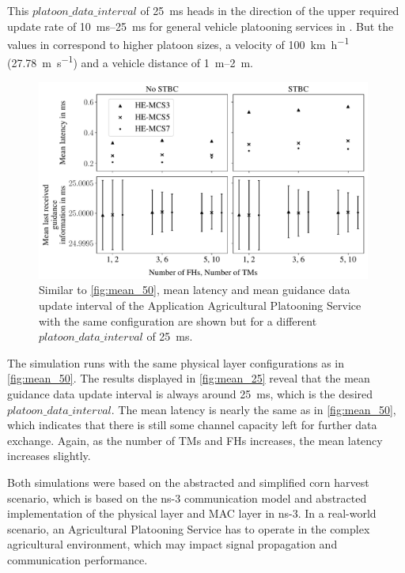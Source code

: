 This $platoon\_data\_interval$ of \SI{25}{\milli\second} heads in the direction of the upper required update rate of \SIrange{10}{25}{\milli\second} for general
vehicle platooning services in \cite{TR-22.886}.
But the values in \cite{TR-22.886} correspond to higher platoon sizes, a velocity of \SI{100}{\kilo\meter\per\hour} (\SI{27.78}{\meter\per\second}) and a
vehicle distance of \SIrange{1}{2}{\metre}.


\begin{figure}[]%
   \centering
   \includegraphics[width=0.98\textwidth]{Latex/figures/latency_lastUpdate25ms}
   \caption{Similar to \autoref{fig:mean_50}, mean latency and mean guidance data update interval of the Application Agricultural Platooning Service
   with the same configuration are shown but for a different $platoon\_data\_interval$ of \SI{25}{\milli\second}.}
   \label{fig:mean_25}%
\end{figure}

The simulation runs with the same physical layer configurations as in \autoref{fig:mean_50}.
The results displayed in \autoref{fig:mean_25} reveal that the mean guidance data update interval is always around \SI{25}{\milli\second},
which is the desired $platoon\_data\_interval$.
The mean latency is nearly the same as in \autoref{fig:mean_50}, which indicates that there is still some channel capacity left for
further data exchange.
Again, as the number of \acp{TM} and \acp{FH} increases, the mean latency increases slightly.

Both simulations were based on the abstracted and simplified corn harvest scenario, which is based on the ns-3 communication model and
abstracted implementation of the physical layer and MAC layer in ns-3.
In a real-world scenario, an Agricultural Platooning Service has to operate in the complex agricultural environment, which
may impact signal propagation and communication performance.

